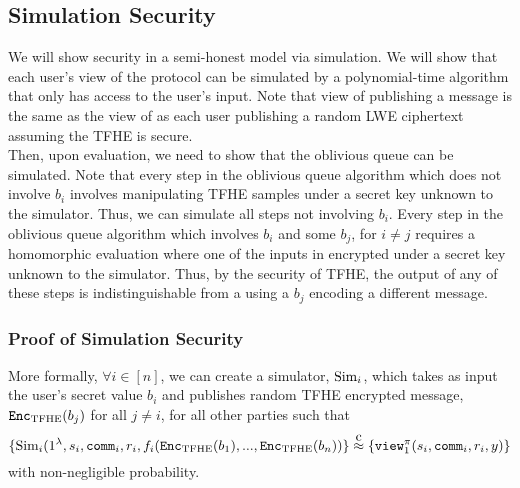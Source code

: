 \subsection{Simulation Security}
We will show security in a semi-honest model via simulation. We will show that each user's view of the protocol can be simulated by a polynomial-time algorithm that only has access to the user's input.
Note that view of publishing a message is the same as the view of as each user publishing a random LWE ciphertext assuming the TFHE is secure.
\\Then, upon evaluation, we need to show that the oblivious queue can be simulated.
Note that every step in the oblivious queue algorithm which does not involve $b_i$ involves manipulating
TFHE samples under a secret key unknown to the simulator. Thus, we can simulate all steps not involving $b_i$.
Every step in the oblivious queue algorithm which involves $b_i$ and some $b_j$, for $i \neq j$ requires 
a homomorphic evaluation where one of the inputs in encrypted under a secret key unknown to the simulator.
Thus, by the security of TFHE, the output of any of these steps is indistinguishable from a using a $b_j$ encoding a different message.

\subsubsection*{Proof of Simulation Security}
More formally, $\forall i \in [n]$, we can create a simulator, $\text{Sim}_i$, which takes as input 
the user's secret value $b_i$ and publishes random TFHE encrypted message, $\texttt{Enc}_{\mathrm{TFHE}}(b_j)$ for all $j \neq i$, for all other parties such that
\begin{equation}
	\label{eq:simulator}
	\{\simulator_i(1^\lambda, s_i, \comm_i, r_i, f_i(\Enc(b_1), ..., \Enc(b_n))\} \compInd \{\texttt{view}^\pi_1(s_i, \comm_i, r_i, y)\} 
\end{equation}
with non-negligible probability.

